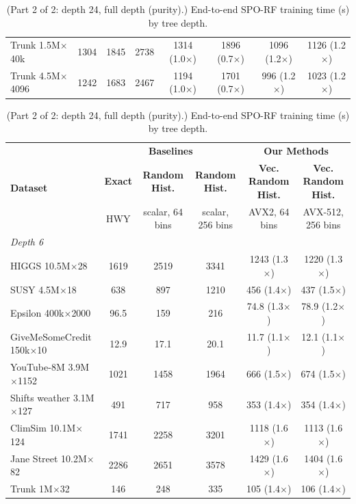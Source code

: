 \begin{table}[p]
\begin{tabular}{l|ccc|cccc}
        Trunk 1.5M$\times$40k & 1304 & 1845 & 2738 & 1314 (1.0$\times$) & 1896 (0.7$\times$) & 1096 (1.2$\times$) & 1126 (1.2$\times$) \\
        Trunk 4.5M$\times$4096 & 1242 & 1683 & 2467 & 1194 (1.0$\times$) & 1701 (0.7$\times$) & 996 (1.2$\times$) & 1023 (1.2$\times$) \\
        \hline
    \end{tabular}
    \caption{(Part 2 of 2: depth 24, full depth (purity).) End-to-end SPO-RF training time (s) by tree depth.}
    \label{tab:overall-p2}
    \vspace{10pt}
    \footnotesize
    \setlength{\tabcolsep}{2.5pt}
    \begin{tabular}{l|ccc|cc}
        \hline
        \multirow{3}{*}{\textbf{Dataset}} & \multicolumn{3}{c|}{\textbf{Baselines}} & \multicolumn{2}{c}{\textbf{Our Methods}} \\
         & \textbf{Exact} & \textbf{Random Hist.} & \textbf{Random Hist.} & \textbf{Vec. Random Hist.} & \textbf{Vec. Random Hist.} \\
         & \scriptsize HWY & \scriptsize scalar, 64 bins & \scriptsize scalar, 256 bins & \scriptsize AVX2, 64 bins & \scriptsize AVX-512, 256 bins \\
        \hline
        \multicolumn{6}{l}{\textit{Depth 6}} \\
        HIGGS 10.5M$\times$28 & 1619 & 2519 & 3341 & 1243 (1.3$\times$) & 1220 (1.3$\times$) \\
        SUSY 4.5M$\times$18 & 638 & 897 & 1210 & 456 (1.4$\times$) & 437 (1.5$\times$) \\
        Epsilon 400k$\times$2000 & 96.5 & 159 & 216 & 74.8 (1.3$\times$) & 78.9 (1.2$\times$) \\
        GiveMeSomeCredit 150k$\times$10 & 12.9 & 17.1 & 20.1 & 11.7 (1.1$\times$) & 12.1 (1.1$\times$) \\
        YouTube-8M 3.9M$\times$1152 & 1021 & 1458 & 1964 & 666 (1.5$\times$) & 674 (1.5$\times$) \\
        Shifts weather 3.1M$\times$127 & 491 & 717 & 958 & 353 (1.4$\times$) & 354 (1.4$\times$) \\
        ClimSim 10.1M$\times$124 & 1741 & 2258 & 3201 & 1118 (1.6$\times$) & 1113 (1.6$\times$) \\
        Jane Street 10.2M$\times$82 & 2286 & 2651 & 3578 & 1429 (1.6$\times$) & 1404 (1.6$\times$) \\
        Trunk 1M$\times$32 & 146 & 248 & 335 & 105 (1.4$\times$) & 106 (1.4$\times$) \\

\end{tabular}
\end{table}
